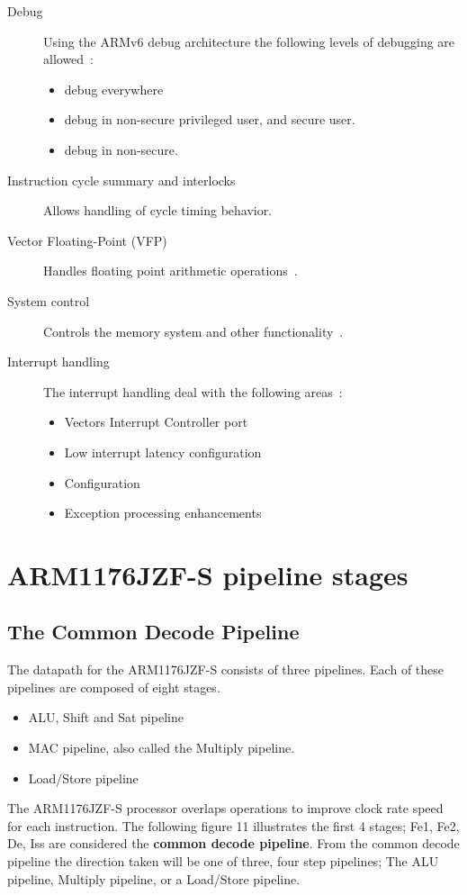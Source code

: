 \documentclass[11pt]{report}
\begin{document}
\begin{description}
\item [Debug] Using the ARMv6 debug architecture the following levels of debugging are allowed~\citep[1-18]{arm1176jzf-s}:
\begin{itemize}
\item debug everywhere
\item debug in non-secure privileged user, and secure user.
\item debug in non-secure.
\end{itemize}
\item [Instruction cycle summary and interlocks] Allows handling of cycle timing behavior.
\item [Vector Floating-Point (VFP)] Handles floating point arithmetic operations~\citep[1-19]{arm1176jzf-s}.
\item [System control] Controls the memory system and other functionality~\citep[1-21]{arm1176jzf-s}.
\item [Interrupt handling] The interrupt handling deal with the following areas~\citep[1-21]{arm1176jzf-s}:
\begin{itemize}
\item Vectors Interrupt Controller port
\item Low interrupt latency configuration
\item Configuration
\item Exception processing enhancements
\end{itemize}
\end{description}
\section{ARM1176JZF-S pipeline stages}
\begin{onehalfspace}
\subsection{The Common Decode Pipeline}
The datapath for the ARM1176JZF-S consists of three pipelines. Each of these pipelines are composed of eight stages.
\begin{itemize}
\item ALU, Shift and Sat pipeline
\item MAC pipeline, also called the Multiply pipeline.
\item Load/Store pipeline
\end{itemize}
The ARM1176JZF-S  processor overlaps operations to improve clock rate speed for each instruction. The following figure 11 illustrates the first 4 stages; Fe1, Fe2, De, Iss are considered the \textbf{common decode pipeline}. From the common decode pipeline the direction taken will be one of three, four step pipelines; The ALU pipeline, Multiply pipeline, or a Load/Store pipeline.
\end{onehalfspace}
\end{document}
